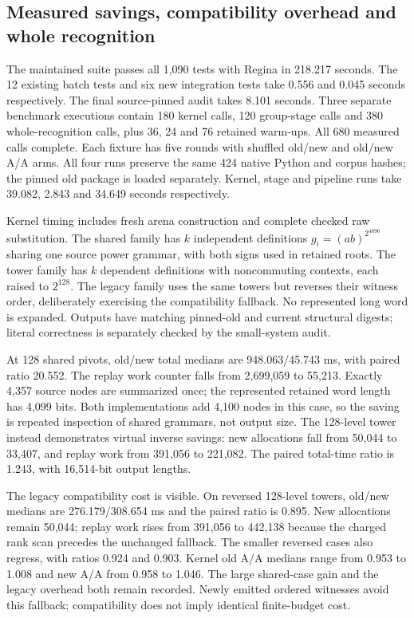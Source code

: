 \subsection{Measured savings, compatibility overhead and whole recognition}

The maintained suite passes all 1,090 tests with Regina in 218.217 seconds.
The 12 existing batch tests and six new integration tests take 0.556 and
0.045 seconds respectively. The final source-pinned audit takes 8.101 seconds.
Three separate benchmark executions contain 180 kernel calls, 120 group-stage
calls and 380 whole-recognition calls, plus 36, 24 and 76 retained warm-ups.
All 680 measured calls complete. Each fixture has five rounds with shuffled
old/new and old/new A/A arms. All four runs preserve the same 424 native Python
and corpus hashes; the pinned old package is loaded separately. Kernel,
stage and pipeline runs take 39.082, 2.843 and 34.649 seconds respectively.

Kernel timing includes fresh arena construction and complete checked raw
substitution. The shared family has $k$ independent definitions
$g_i=(ab)^{2^{4096}}$ sharing one source power grammar, with both signs used
in retained roots. The tower family has $k$ dependent definitions with
noncommuting contexts, each raised to $2^{128}$. The legacy family uses the
same towers but reverses their witness order, deliberately exercising the
compatibility fallback. No represented long word is expanded. Outputs have
matching pinned-old and current structural digests; literal correctness is
separately checked by the small-system audit.



At 128 shared pivots, old/new total medians are 948.063/45.743 ms, with
paired ratio 20.552. The replay work counter falls from 2,699,059 to 55,213.
Exactly 4,357 source nodes are summarized once; the represented retained
word length has 4,099 bits. Both implementations add 4,100 nodes in this
case, so the saving is repeated inspection of shared grammars, not output
size. The 128-level tower instead demonstrates virtual inverse savings:
new allocations fall from 50,044 to 33,407, and replay work from 391,056 to
221,082. The paired total-time ratio is 1.243, with 16,514-bit output lengths.

The legacy compatibility cost is visible. On reversed 128-level towers,
old/new medians are 276.179/308.654 ms and the paired ratio is 0.895. New
allocations remain 50,044; replay work rises from 391,056 to 442,138 because
the charged rank scan precedes the unchanged fallback. The smaller reversed
cases also regress, with ratios 0.924 and 0.903. Kernel old A/A medians range
from 0.953 to 1.008 and new A/A from 0.958 to 1.046. The large shared-case gain
and the legacy overhead both remain recorded. Newly emitted ordered witnesses
avoid this fallback; compatibility does not imply identical finite-budget cost.


